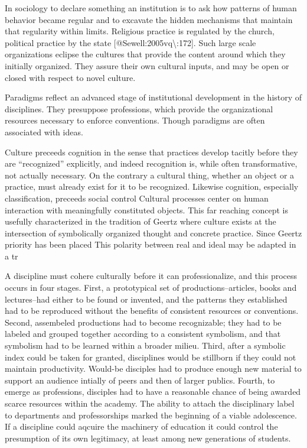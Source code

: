 \documentclass [PhD] {uclathes}
\begin{document}
In sociology to declare something an institution is to ask how patterns
of human behavior became regular and to excavate the hidden mechanisms
that maintain that regularity within limits. Religious practice is
regulated by the church, political practice by the state
{[}@Sewell:2005vq\textbackslash{}:172{]}. Such large scale organizations
eclipse the cultures that provide the content around which they
initially organized. They assure their own cultural inputs, and may be
open or closed with respect to novel culture.

Paradigms reflect an advanced stage of institutional development in the
history of disciplines. They presuppose professions, which provide the
organizational resources necessary to enforce conventions. Though
paradigms are often associated with ideas.

Culture preceeds cognition in the sense that practices develop tacitly
before they are ``recognized'' explicitly, and indeed recognition is,
while often transformative, not actually necessary. On the contrary a
cultural thing, whether an object or a practice, must already exist for
it to be recognized. Likewise cognition, especially classification,
preceeds social control Cultural processes center on human interaction
with meaningfully constituted objects. This far reaching concept is
usefully characterized in the tradition of Geertz where culture exists
at the intersection of symbolically organized thought and concrete
practice. Since Geertz priority has been placed This polarity between
real and ideal may be adapted in a tr

A discipline must cohere culturally before it can professionalize, and
this process occurs in four stages. First, a prototypical set of
productions--articles, books and lectures--had either to be found or
invented, and the patterns they established had to be reproduced without
the benefits of consistent resources or conventions. Second, assembeled
productions had to become recognizable; they had to be labeled and
grouped together according to a consistent symbolism, and that symbolism
had to be learned within a broader milieu. Third, after a symbolic index
could be taken for granted, disciplines would be stillborn if they could
not maintain productivity. Would-be disciples had to produce enough new
material to support an audience intially of peers and then of larger
publics. Fourth, to emerge as professions, disciples had to have a
reasonable chance of being awarded scarce resources within the academy.
The ability to attach the disciplinary label to departments and
professorships marked the beginning of a viable adolescence. If a
discipline could aqcuire the machinery of education it could control the
presumption of its own legitimacy, at least among new generations of
students.
\end{document}
